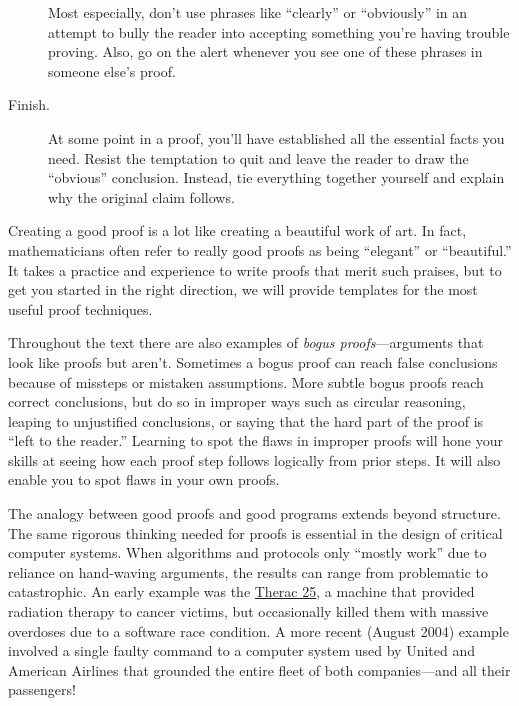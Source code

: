 \begin{description}
  Most especially, don't use phrases like ``clearly'' or ``obviously'' in
  an attempt to bully the reader into accepting something you're having
  trouble proving.  Also, go on the alert whenever you see one of these
  phrases in someone else's proof.

\item[Finish.]  At some point in a proof, you'll have established all the
essential facts you need.  Resist the temptation to quit and leave the
reader to draw the ``obvious'' conclusion.  Instead, tie everything
together yourself and explain why the original claim follows.

\end{description}

Creating a good proof is a lot like creating a beautiful work of art.  In
fact, mathematicians often refer to really good proofs as being
``elegant'' or ``beautiful.''  It takes a practice and experience to write
proofs that merit such praises, but to get you started in
the right direction, we will provide templates for the most useful proof
techniques.

Throughout the text there are also examples of \emph{bogus
  proofs}---arguments that look like proofs but aren't.  Sometimes a
bogus proof can reach false conclusions because of missteps or
mistaken assumptions.  More subtle bogus proofs reach correct
conclusions, but do so in improper ways such as circular reasoning,
leaping to unjustified conclusions, or saying that the hard part of
the proof is ``left to the reader.''  Learning to spot the flaws in
improper proofs will hone your skills at seeing how each proof step
follows logically from prior steps.  It will also enable you to spot
flaws in your own proofs.

The analogy between good proofs and good programs extends beyond
structure.  The same rigorous thinking needed for proofs is essential in
the design of critical computer systems.  When algorithms and protocols
only ``mostly work'' due to reliance on hand-waving arguments, the results
can range from problematic to catastrophic.  An early example was the
\href{http://sunnyday.mit.edu/papers/therac.pdf}{Therac 25}, 
a machine that provided radiation therapy to cancer victims,
but occasionally killed them with massive overdoses due to a software race
condition.  A more recent (August 2004) example involved a single faulty
command to a computer system used by United and American Airlines that
grounded the entire fleet of both companies---and all their passengers!

